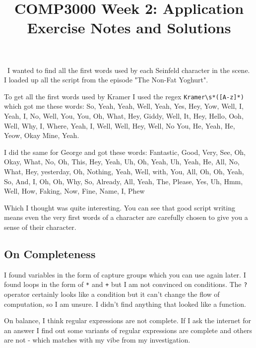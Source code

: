 \documentclass[twoside=false, DIV=14]{scrartcl}
\title{\color{redish} \vspace{-1em}COMP3000 Week 2: Application Exercise Notes and Solutions}
\begin{document}
{\color{blackish}\maketitle}
\
I wanted to find all the first words used by each Seinfeld character in the scene.  I loaded up all the script from the episode "The Non-Fat Yoghurt".

To get all the first words used by Kramer I used the regex \verb|Kramer\s*([A-z]*)| which got me these words: So, Yeah, Yeah, Well, Yeah, Yes, Hey, Yow, Well, I, Yeah, I, No, Well, You, You, Oh, What, Hey, Giddy, Well, It, Hey, Hello, Ooh, Well, Why, I, Where, Yeah, I, Well, Well, Hey, Well, No
You, He, Yeah, He, Yeow, Okay
Mine, Yeah.

I did the same for George and got these words: Fantastic, Good, Very, See, Oh, Okay, What, No, Oh, This, Hey, Yeah, Uh, Oh, Yeah, Uh, Yeah, He, All, No, What, Hey, yesterday, Oh, Nothing, Yeah, Well, with, You, All, Oh, Oh, Yeah, So, And, I, Oh, Oh, Why, So, Already, All, Yeah, The, Please, Yes, Uh, Hmm, Well, How, Faking, Now, Fine, Name, I, Phew

Which I thought was quite interesting.  You can see that good script writing means even the very first words of a character are carefully chosen to give you a sense of their character.  

\subsection*{On Completeness}
I found variables in the form of capture groups which you can use again later.  I found loops in the form of \verb|*| and \verb|+| but I am not convinced on conditions.  The \verb|?| operator certainly looks like a condition but it can't change the flow of computation, so I am unsure.  I didn't find anything that looked like a function.

On balance, I think regular expressions are not complete.  If I ask the internet for an answer I find out some variants of regular expressions are complete and others are not - which matches with my vibe from my investigation.
\end{document}
